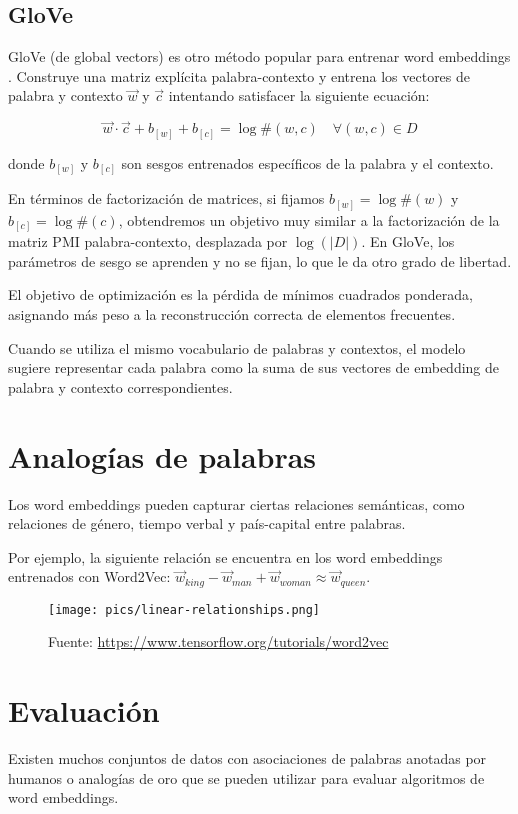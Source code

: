 \subsection{GloVe}
GloVe (de global vectors) es otro método popular para entrenar word embeddings \cite{penningtonSM14}. Construye una matriz explícita palabra-contexto y entrena los vectores de palabra y contexto $\vec{w}$ y $\vec{c}$ intentando satisfacer la siguiente ecuación:

\begin{equation}
\vec{w} \cdot \vec{c} + b_{[w]}+b_{[c]} = \log \#(w,c) \quad \forall (w,c) \in D
\end{equation}

donde $b_{[w]}$ y $b_{[c]}$ son sesgos entrenados específicos de la palabra y el contexto.

En términos de factorización de matrices, si fijamos $b_{[w]}=\log \#(w)$ y $b_{[c]}=\log \#(c)$, obtendremos un objetivo muy similar a la factorización de la matriz PMI palabra-contexto, desplazada por $\log (|D|)$.
En GloVe, los parámetros de sesgo se aprenden y no se fijan, lo que le da otro grado de libertad.

El objetivo de optimización es la pérdida de mínimos cuadrados ponderada, asignando más peso a la reconstrucción correcta de elementos frecuentes.

Cuando se utiliza el mismo vocabulario de palabras y contextos, el modelo sugiere representar cada palabra como la suma de sus vectores de embedding de palabra y contexto correspondientes.

\section{Analogías de palabras}
Los word embeddings pueden capturar ciertas relaciones semánticas, como relaciones de género, tiempo verbal y país-capital entre palabras.

Por ejemplo, la siguiente relación se encuentra en los word embeddings entrenados con Word2Vec: $\vec{w}_{king} - \vec{w}_{man} + \vec{w}_{woman} \approx \vec{w}_{queen}$.

\begin{figure}[h]
	\centering
	\texttt{[image: pics/linear-relationships.png]}
	\caption{Fuente: \url{https://www.tensorflow.org/tutorials/word2vec}}
\end{figure}

\section{Evaluación}
Existen muchos conjuntos de datos con asociaciones de palabras anotadas por humanos o analogías de oro que se pueden utilizar para evaluar algoritmos de word embeddings.


